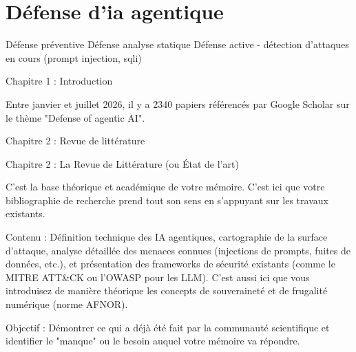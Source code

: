 \section{Défense d'ia agentique}


Défense préventive
Défense analyse statique
Défense active
- détection d'attaques en cours (prompt injection, sqli)

Chapitre 1 : Introduction

Entre janvier et juillet 2026, il y a 2340 papiers référencés par Google Scholar sur le thème "Defense of agentic AI".

Chapitre 2 : Revue de littérature

Chapitre 2 : La Revue de Littérature (ou État de l'art)

C'est la base théorique et académique de votre mémoire. C'est ici que votre bibliographie de recherche prend tout son sens en s'appuyant sur les travaux existants.

Contenu : Définition technique des IA agentiques, cartographie de la surface d'attaque, analyse détaillée des menaces connues (injections de prompts, fuites de données, etc.), et présentation des frameworks de sécurité existants (comme le MITRE ATT&CK ou l'OWASP pour les LLM). C'est aussi ici que vous introduisez de manière théorique les concepts de souveraineté et de frugalité numérique (norme AFNOR).

Objectif : Démontrer ce qui a déjà été fait par la communauté scientifique et identifier le "manque" ou le besoin auquel votre mémoire va répondre.